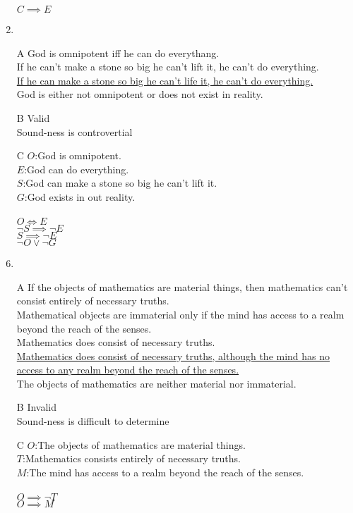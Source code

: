 \documentclass{article}
\begin{document}
\begin{enumerate}
$C \implies E$
\item
\item[A]
God is omnipotent iff he can do everythang.
\\If he can't make a stone so big he can't lift it, he can't do everything.
\\\underline{If he can make a stone so big he can't life it, he can't do everything.}
\\God is either not omnipotent or does not exist in reality.
\item[B]
Valid\\
Sound-ness is controvertial
\item[C]
$O$:God is omnipotent.\\
$E$:God can do everything.\\
$S$:God can make a stone so big he can't lift it.\\
$G$:God exists in out reality.\\
\\
$O \iff E$\\
$\lnot S \implies \lnot E$\\
\underline{$S \implies \lnot E$}\\
$\lnot O \lor \lnot G$
\item
\item[A]
 If the objects of mathematics are material things, then mathematics can't consist entirely of necessary truths.
\\Mathematical objects are immaterial only if the mind has access to a realm beyond the reach of the senses.
\\Mathematics does consist of necessary truths.
\\\underline{Mathematics does consist of necessary truths, although the mind has no access to any realm beyond the reach of the senses.}
\\The objects of mathematics are neither material nor immaterial.	
\item[B]
Invalid\\
Sound-ness is difficult to determine
\item[C]
$O$:The objects of mathematics are material things.\\
$T$:Mathematics consists entirely of necessary truths.\\
$M$:The mind has access to a realm beyond the reach of the senses.\\
\\
$O \implies \lnot T$\\
$O \implies M$\\

\end{enumerate}
\end{document}
